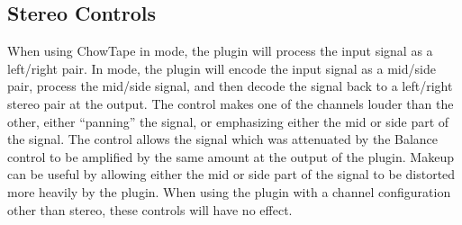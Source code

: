 \documentclass[landscape,twocolumn,a5paper]{manual}
\begin{document}
\subsection{Stereo Controls}

When using ChowTape in  mode, the plugin
will process the input signal as a left/right pair. In 
mode, the plugin will encode the input signal as a mid/side pair,
process the mid/side signal, and then decode the signal back to a
left/right stereo pair at the output.
\newpar
The  control
makes one of the channels louder than the other, either ``panning'' the
signal, or emphasizing either the mid or side part of the signal. The
 control allows the signal which was attenuated by
the Balance control to be amplified by the same amount at the output
of the plugin. Makeup can be useful by allowing either the mid or side
part of the signal to be distorted more heavily by the plugin.
When using the plugin with a channel configuration other than stereo,
these controls will have no effect.
\end{document}
